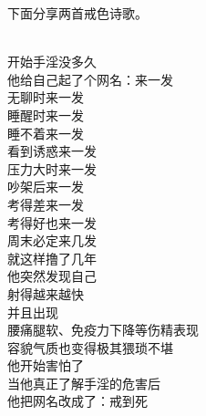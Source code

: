 下面分享两首戒色诗歌。

\begin{poem}[来一发与戒到死]
    \begin{multicols}{2}
        \begin{center}~\\
            开始手淫没多久 \\ 他给自己起了个网名：来一发 \\ 无聊时来一发 \\ 睡醒时来一发 \\ 睡不着来一发 \\ 看到诱惑来一发 \\ 压力大时来一发 \\ 吵架后来一发 \\ 考得差来一发 \\ 考得好也来一发 \\ 周末必定来几发 \\ 就这样撸了几年 \\ 他突然发现自己 \\ 射得越来越快 \\ 并且出现 \\ 腰痛腿软、免疫力下降等伤精表现 \\ 容貌气质也变得极其猥琐不堪 \\ 他开始害怕了 \\ 当他真正了解手淫的危害后 \\ 他把网名改成了：戒到死
        \end{center}
    \end{multicols}
\end{poem}

